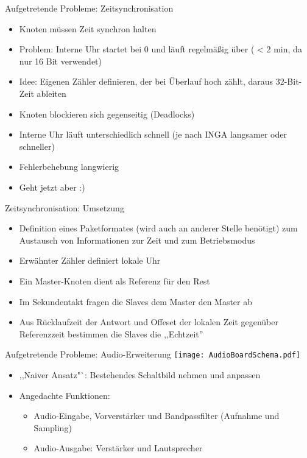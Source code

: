 \documentclass[fleqn,11pt]{beamer}
\begin{document}
\begin{frame}{Aufgetretende Probleme: Zeitsynchronisation}

	\begin{itemize}
	  \item Knoten müssen Zeit synchron halten
	  \item  Problem: Interne Uhr startet bei 0 und läuft regelmäßig über
	    ( < 2 min, da nur 16 Bit verwendet)
	  \item  Idee: Eigenen Zähler definieren, der bei Überlauf hoch
	    zählt,
	    daraus 32-Bit-Zeit ableiten
	  \item  Knoten blockieren sich gegenseitig (Deadlocks)
	   \item Interne Uhr läuft unterschiedlich schnell (je nach INGA
	    langsamer
	    oder schneller)
	   \item Fehlerbehebung langwierig
	    \item Geht jetzt aber :)
	\end{itemize}
\end{frame}


\begin{frame}{Zeitsynchronisation: Umsetzung}
	\begin{itemize}
	    \item Definition eines Paketformates (wird auch an anderer Stelle
	    benötigt) zum Austausch von Informationen zur Zeit und zum
	    Betriebsmodus
	  \item Erwähnter Zähler definiert lokale Uhr
	  \item    Ein Master-Knoten dient als Referenz für den Rest
	  \item  Im Sekundentakt fragen die Slaves dem Master den Master ab
	  \item   Aus Rücklaufzeit der Antwort und Offeset der lokalen Zeit
	    gegenüber Referenzzeit bestimmen die Slaves die ,,Echtzeit''

	\end{itemize}
\end{frame}

\begin{frame}{Aufgetretende Probleme: Audio-Erweiterung}
	\texttt{[image: AudioBoardSchema.pdf]}
	\begin{itemize}
	  \item ,,Naiver Ansatz"`: Bestehendes Schaltbild nehmen und
	    anpassen
	   \item
	    Angedachte Funktionen:
	    \begin{itemize}
	      \item    Audio-Eingabe, Vorverstärker und Bandpassfilter (Aufnahme
	       und	          Sampling)
	     \item   Audio-Ausgabe: Verstärker und Lautsprecher
	\end{itemize}
	\end{itemize}
\end{frame}
\end{document}
